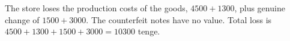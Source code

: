 The store loses the production costs of the goods, $4500+1300$, plus genuine change of $1500+3000$. The counterfeit notes have no value. Total loss is $4500+1300+1500+3000=\boxed{10300}$ tenge.
